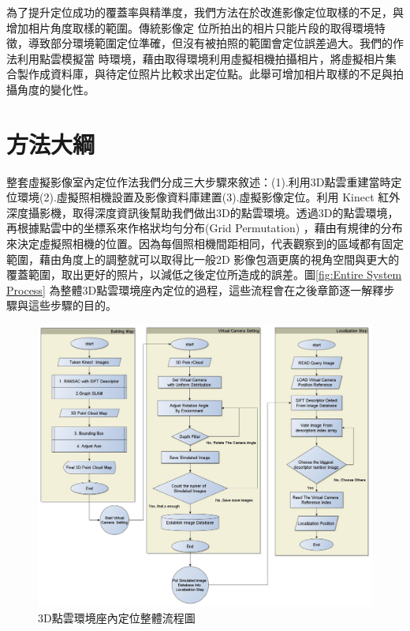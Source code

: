 
%

	為了提升定位成功的覆蓋率與精準度，我們方法在於改進影像定位取樣的不足，與增加相片角度取樣的範圍。傳統影像定
位所拍出的相片只能片段的取得環境特徵，導致部分環境範圍定位準確，但沒有被拍照的範圍會定位誤差過大。我們的作法利用點雲模擬當
時環境，藉由取得環境利用虛擬相機拍攝相片，將虛擬相片集合製作成資料庫，與待定位照片比較求出定位點。此舉可增加相片取樣的不足與拍
攝角度的變化性。

\section{方法大綱}
	整套虛擬影像室內定位作法我們分成三大步驟來敘述：(1).利用3D點雲重建當時定位環境(2).虛擬照相機設置及影像資料庫建置(3).虛擬影像定位。利用 
Kinect 紅外深度攝影機，取得深度資訊後幫助我們做出3D的點雲環境。透過3D的點雲環境，再根據點雲中的坐標系來作格狀均勻分布(Grid Permutation)
，藉由有規律的分布來決定虛擬照相機的位置。因為每個照相機間距相同，代表觀察到的區域都有固定範圍，藉由角度上的調整就可以取得比一般2D
影像包涵更廣的視角空間與更大的覆蓋範圍，取出更好的照片，以減低之後定位所造成的誤差。圖\ref{fig:Entire System Process}
為整體3D點雲環境座內定位的過程，這些流程會在之後章節逐一解釋步驟與這些步驟的目的。
  
\begin{figure}
\begin{center}

  \includegraphics[width=1.1\textwidth]{figures/Enire_System_Process.jpg}
  \caption{3D點雲環境座內定位整體流程圖}
  \label{fig:Enire System Process}
  
\end{center}
\end{figure}
  
